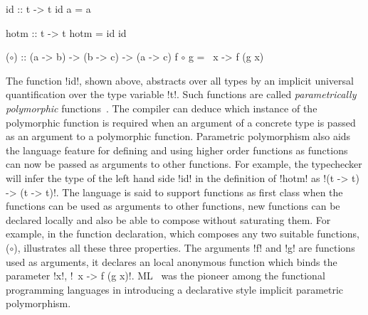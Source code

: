 \documentclass[screen,nonacm,manuscript,review]{acmart} %
\begin{document}
\begin{minipage}{0.3\linewidth}
\begin{CenteredBox}
\begin{code}
id :: t -> t
id a = a
\end{code}
\end{CenteredBox}
\end{minipage}%
\begin{minipage}[ht]{0.3\linewidth}
\begin{CenteredBox}
\begin{code}
hotm :: t -> t
hotm = id id
\end{code}
\end{CenteredBox}
\end{minipage}%
\begin{minipage}[ht]{0.3\linewidth}
\begin{CenteredBox}
\begin{code}
($\circ$) :: (a -> b) -> (b -> c) -> (a -> c)
f $\circ$ g  = \ x -> f (g x)
\end{code}
\end{CenteredBox}
\end{minipage}


The function !id!, shown above, abstracts over all types by an implicit universal
quantification over the type variable !t!. Such functions are called \emph{parametrically
polymorphic} functions~\cite{strachey_fundamental_2000}. The compiler
can deduce which instance of the polymorphic function is required when
an argument of a concrete type is passed as an argument to a
polymorphic function. Parametric polymorphism also aids the language
feature for defining and using higher order functions as functions can
now be passed as arguments to other functions. For example, the
typechecker will infer the type of the left hand side !id! in the
definition of !hotm! as !(t -> t) -> (t -> t)!. The language is said
to support functions as first class when the functions can be
used as arguments to other functions, new functions can be declared
locally and also be able to compose without saturating them. For
example, in the function declaration, which composes any two suitable
functions, ($\circ$), illustrates all these three properties. The
arguments !f! and !g! are functions used as arguments, it declares an
local anonymous function which binds the parameter !x!, !\ x -> f (g x)!.
ML~\cite{milner_logic_1975,milner_theory_1978}
was the pioneer among the functional programming languages in
introducing a declarative style implicit parametric polymorphism.
\end{document}
